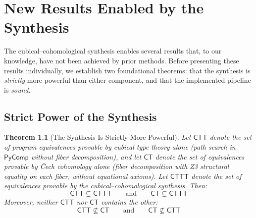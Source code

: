 \documentclass[11pt,a4paper]{report}
\theoremstyle{definition}
\theoremstyle{plain}
\newtheorem{theorem}[definition]{Theorem}
\begin{document}
\chapter{New Results Enabled by the Synthesis}
\label{ch:new-results}

The cubical--cohomological synthesis enables several results that, to
our knowledge, have not been achieved by prior methods.  Before
presenting these results individually, we establish two foundational
theorems: that the synthesis is \emph{strictly} more powerful than
either component, and that the implemented pipeline is \emph{sound}.

\section{Strict Power of the Synthesis}
\label{sec:strict-power}

\begin{theorem}[The Synthesis Is Strictly More Powerful]
\label{thm:strict-power}
Let $\mathsf{CTT}$ denote the set of program equivalences provable by
cubical type theory alone (path search in $\mathsf{PyComp}$ without
fiber decomposition), and let $\mathsf{CT}$ denote the set of
equivalences provable by \v{C}ech cohomology alone (fiber
decomposition with Z3 structural equality on each fiber, without
equational axioms).  Let $\mathsf{CTTT}$ denote the set of
equivalences provable by the cubical--cohomological synthesis.  Then:
\[
  \mathsf{CTT} \subsetneq \mathsf{CTTT}
  \qquad\text{and}\qquad
  \mathsf{CT} \subsetneq \mathsf{CTTT}
\]
Moreover, neither $\mathsf{CTT}$ nor $\mathsf{CT}$ contains the
other:
\[
  \mathsf{CTT} \not\subseteq \mathsf{CT}
  \qquad\text{and}\qquad
  \mathsf{CT} \not\subseteq \mathsf{CTT}
\]
\end{theorem}
\end{document}
